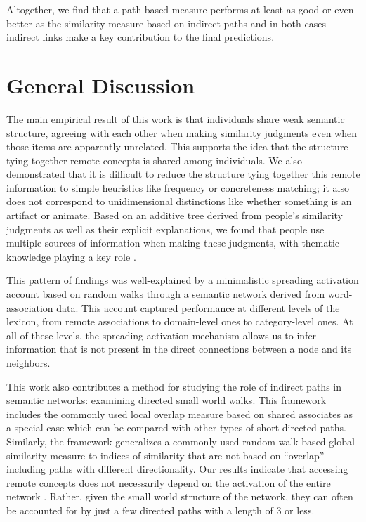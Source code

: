 \documentclass[doc]{apa6}
\begin{document}
Altogether, we find that a path-based measure performs at least as good or even better as the similarity measure based on indirect paths and in both cases indirect links make a key contribution to the final predictions.

\FloatBarrier


\section{General Discussion}

The main empirical result of this work is that individuals share weak semantic structure, agreeing with each other when making similarity judgments even when those items are apparently unrelated. This supports the idea that the structure tying together remote concepts is shared among individuals. We also demonstrated that it is difficult to reduce the  structure tying together this remote information to simple heuristics like frequency or concreteness matching; it also does not correspond to unidimensional distinctions like whether something is an artifact or animate. Based on an additive tree derived from people's similarity judgments as well as their explicit explanations, we found that people use multiple sources of information when making these judgments, with thematic knowledge playing a key role \parencite[consistent with][]{EstesGolonka2011,Lin2001,Wisniewski1999,Ross1999}.

This pattern of findings was well-explained by a minimalistic spreading activation account based on random walks through a semantic network derived from word-association data. This account captured performance at different levels of the lexicon, from remote associations to domain-level ones to category-level ones. At all of these levels, the spreading activation mechanism allows us to infer information that is not present in the direct connections between a node and its neighbors.

This work also contributes a method for studying the role of indirect paths in semantic networks: examining directed small world walks. This framework includes the commonly used local overlap measure based on shared associates as a special case which can be compared with other types of short directed paths. Similarly, the framework generalizes a commonly used random walk-based global similarity measure to indices of similarity that are not based on ``overlap'' including paths with different directionality. Our results indicate that accessing remote concepts does not necessarily depend on the activation of the entire network \parencite{Ratcliff1994}. Rather, given the small world structure of the network, they can often be accounted for by just a few directed paths with a length of 3 or less.
\end{document}
